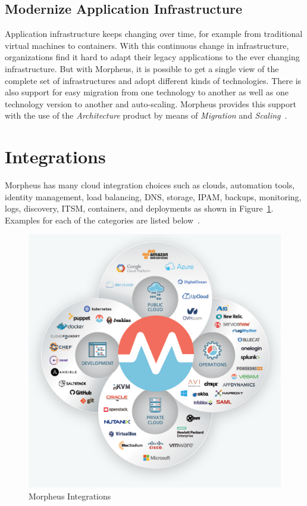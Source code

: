 \subsection{Modernize Application Infrastructure}

Application infrastructure keeps changing over time, for example from 
traditional virtual machines to containers. With this continuous change in 
infrastructure, organizations find it hard to adapt their legacy applications 
to the ever changing infrastructure. But with Morpheus, it is possible to get a 
single view of the complete set of infrastructures and adopt different kinds of 
technologies. There is also support for easy migration from one technology to 
another as well as one technology version to another and auto-scaling. Morpheus 
provides this support with the use of the \textit{Architecture} product by 
means of \textit{Migration} and 
\textit{Scaling}~\cite{hid-sp18-416-www-morpheus-product-guide}.

\section{Integrations}
\label{sec:integrations}

Morpheus has many cloud integration choices such as clouds, automation tools, 
identity management, load balancing, DNS, storage, IPAM, backups, monitoring, 
logs, discovery, ITSM, containers, and deployments as shown in 
Figure~\ref{fig:integrations}. Examples 
for each of the categories are listed 
below~\cite{hid-sp18-416-www-morpheus-integrations}. 

\begin{figure}[htb]
	\centering
	\includegraphics[width=\columnwidth]{../images/MorpheusIntegrations.png}
	\caption{Morpheus 
	Integrations~\cite{hid-sp18-416-www-morpheus-product-guide}}
\label{fig:integrations}
\end{figure}

